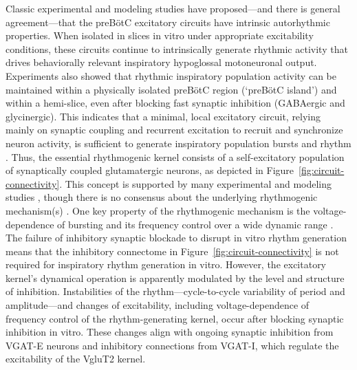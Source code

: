 \documentclass[
]{article}
\newcommand{\figref}[1]{Figure~\ref{#1}}
\begin{document}
Classic experimental and modeling studies have proposed---and there is general agreement---that the preBötC excitatory circuits have intrinsic autorhythmic properties. When isolated in slices in vitro under appropriate excitability conditions, these circuits continue to intrinsically generate rhythmic activity that drives behaviorally relevant inspiratory hypoglossal motoneuronal output. Experiments also showed that rhythmic inspiratory population activity can be maintained within a physically isolated preBötC region (`preBötC island') and within a hemi-slice, even after blocking fast synaptic inhibition (GABAergic and glycinergic). This indicates that a minimal, local excitatory circuit, relying mainly on synaptic coupling and recurrent excitation to recruit and synchronize neuron activity, is sufficient to generate inspiratory population bursts and rhythm \citep{delnegro2001experimental,johnson2001island}. Thus, the essential rhythmogenic kernel consists of a self-excitatory population of synaptically coupled glutamatergic neurons, as depicted in \figref{fig:circuit-connectivity}. This concept is supported by many experimental and modeling studies \citep{delnegro2001experimental,johnson2001island,smith2007spatial,rubin2009multiple,molkov2017computational,phillips2019biophysical,phillips2022predictions}, though there is no consensus about the underlying rhythmogenic mechanism(s) \citep{butera1999bursting,butera1999coupled,delnegro2018defining,phillips2019biophysical,phillips2022predictions}. One key property of the rhythmogenic mechanism is the voltage-dependence of bursting and its frequency control over a wide dynamic range \citep{butera1999bursting,butera1999coupled,delnegro2001experimental,koizumi2013structural,phillips2022predictions}. The failure of inhibitory synaptic blockade to disrupt in vitro rhythm generation means that the inhibitory connectome in \figref{fig:circuit-connectivity} is not required for inspiratory rhythm generation in vitro. However, the excitatory kernel's dynamical operation is apparently modulated by the level and structure of inhibition. Instabilities of the rhythm---cycle-to-cycle variability of period and amplitude---and changes of excitability, including voltage-dependence of frequency control of the rhythm-generating kernel, occur after blocking synaptic inhibition in vitro. These changes align with ongoing synaptic inhibition from VGAT-E neurons and inhibitory connections from VGAT-I, which regulate the excitability of the VgluT2 kernel.
\end{document}
